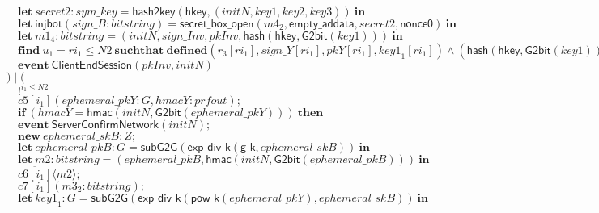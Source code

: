 \documentclass{article}
\newcommand{\cinput}[2]{{#1}({#2})}
\newcommand{\coutput}[2]{\overline{#1}\langle{#2}\rangle}
\newcommand{\kw}[1]{\mathbf{#1}}
\newcommand{\kwf}[1]{\mathsf{#1}}
\newcommand{\var}[1]{\mathit{#1}}
\newcommand{\kwt}[1]{\mathit{#1}}
\newcommand{\kwp}[1]{\mathit{#1}}
\newcommand{\kwc}[1]{\mathit{#1}}
\begin{document}
\begin{tabbing}
\>$\quad \kw{let}\ \var{secret2}: \kwt{sym{\_}key} = \kwf{hash2key}(\kwf{hkey}, \kwf{}(\var{initN}, \var{key1}, \var{key2}, \var{key3}))\ \kw{in}$\\
\>$\quad \kw{let}\ \kwf{injbot}(\var{sign{\_}B}: \kwt{bitstring}) = \kwf{secret{\_}box{\_}open}(\var{m4}_{2}, \kwf{empty{\_}addata}, \var{secret2}, \kwf{nonce0})\ \kw{in}$\\
\>$\quad \kw{let}\ \var{m1}_{4}: \kwt{bitstring} = \kwf{}(\var{initN}, \var{sign{\_}Inv}, \var{pkInv}, \kwf{hash}(\kwf{hkey}, \kwf{G2bit}(\var{key1})))\ \kw{in}$\\
\>$\quad \kw{find}\ \var{u}_{1} = \var{ri}_{1} \leq \kwp{N2}\ \kw{suchthat}\ \kw{defined}(\var{r}_{3}[\var{ri}_{1}], \var{sign{\_}Y}[\var{ri}_{1}], \var{pkY}[\var{ri}_{1}], \var{key1}_{1}[\var{ri}_{1}])\wedge (\kwf{hash}(\kwf{hkey}, \kwf{G2bit}(\var{key1}))  =  \kwf{hash}(\kwf{hkey}, \kwf{G2bit}(\var{key1}_{1}[\var{ri}_{1}]))) \wedge  (\var{pkInv}  =  \var{pkY}[\var{ri}_{1}]) \wedge  (\var{sign{\_}Inv}  =  \var{sign{\_}Y}[\var{ri}_{1}]) \wedge  \kwf{check2}(\var{m1}_{4}, \kwf{pkgen2}(\var{signB}_{1}), \var{sign{\_}B})\ \kw{then}$\\
\>$\quad \kw{event}\ \kwf{ClientEndSession}(\var{pkInv}, \var{initN})$\\
\>$) \mid ($\\
\>$\quad !^{\var{i}_{1} \leq \kwp{N2}}$\\
\>$\quad \cinput{\kwc{c5}[\var{i}_{1}]}{\var{ephemeral{\_}pkY}: \kwt{G}, \var{hmacY}: \kwt{prfout}};$\\
\>$\quad \kw{if}\ (\var{hmacY}  =  \kwf{hmac}(\var{initN}, \kwf{G2bit}(\var{ephemeral{\_}pkY})))\ \kw{then}$\\
\>$\quad \kw{event}\ \kwf{ServerConfirmNetwork}(\var{initN});$\\
\>$\quad \kw{new}\ \var{ephemeral{\_}skB}: \kwt{Z};$\\
\>$\quad \kw{let}\ \var{ephemeral{\_}pkB}: \kwt{G} = \kwf{subG2G}(\kwf{exp{\_}div{\_}k}(\kwf{g{\_}k}, \var{ephemeral{\_}skB}))\ \kw{in}$\\
\>$\quad \kw{let}\ \var{m2}: \kwt{bitstring} = \kwf{}(\var{ephemeral{\_}pkB}, \kwf{hmac}(\var{initN}, \kwf{G2bit}(\var{ephemeral{\_}pkB})))\ \kw{in}$\\
\>$\quad \coutput{\kwc{c6}[\var{i}_{1}]}{\var{m2}};$\\
\>$\quad \cinput{\kwc{c7}[\var{i}_{1}]}{\var{m3}_{2}: \kwt{bitstring}};$\\
\>$\quad \kw{let}\ \var{key1}_{1}: \kwt{G} = \kwf{subG2G}(\kwf{exp{\_}div{\_}k}(\kwf{pow{\_}k}(\var{ephemeral{\_}pkY}), \var{ephemeral{\_}skB}))\ \kw{in}$\\

\end{tabbing}
\end{document}
